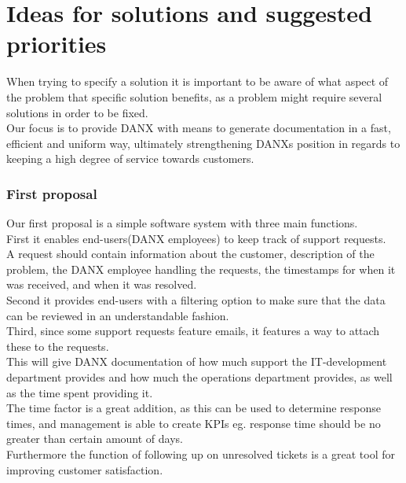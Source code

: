 \section{Ideas for solutions and suggested priorities}
\label{sec:ideas}
When trying to specify a solution it is important to be aware of what aspect of the problem that specific solution benefits, as a problem might require several solutions in order to be fixed.\\
Our focus is to provide DANX with means to generate documentation in a fast, efficient and uniform way, ultimately strengthening DANXs position in regards to keeping a high degree of service towards customers.

\subsubsection{First proposal}
Our first proposal is a simple software system with three main functions.\\
First it enables end-users(DANX employees) to keep track of support requests.\\
A request should contain information about the customer, description of the problem, the DANX employee handling the requests, the timestamps for when it was received, and when it was resolved.\\
Second it provides end-users with a filtering option to make sure that the data can be reviewed in an understandable fashion.\\
Third, since some support requests feature emails, it features a way to attach these to the requests.\\
This will give DANX documentation of how much support the IT-development department provides and how much the operations department provides, as well as the time spent providing it.\\
The time factor is a great addition, as this can be used to determine response times, and management is able to create KPIs eg. response time should be no greater than certain amount of days.\\
Furthermore the function of following up on unresolved tickets is a great tool for improving customer satisfaction.

